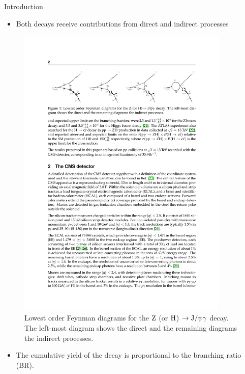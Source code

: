 \documentclass[aspectratio = 1610, xcolor = dvipsnames]{beamer}
\renewcommand{\H}{{\rm H}}
\newcommand{\Z}{{\rm Z}}
\newcommand{\JPsi}{{\rm J}/\psi}
\begin{document}
	
	\begin{frame}[t]{Introduction}
        
        \begin{itemize}
			\item Both decays receive contributions from \textcolor{unipd}{direct} and \textcolor{unipd}{indirect} processes
		\end{itemize}

		\begin{figure}[c]
			\centering
			\includegraphics[width=0.9\textwidth]{images/direct_and_indirect_processes.pdf}
			\caption{Lowest order Feynman diagrams for the $\Z$ (or $\H$) $\rightarrow \JPsi\gamma$ decay. The left-most diagram shows the direct and the remaining diagrams the indirect processes\footnotemark.
			\label{im:direct_and_indirect_processes}}
	    \end{figure}

	    
	    \begin{itemize}
			\item The cumulative yield of the decay is \textcolor{unipd}{proportional to the branching ratio (BR)}.
		\end{itemize}

	\end{frame}
	
\end{document}
